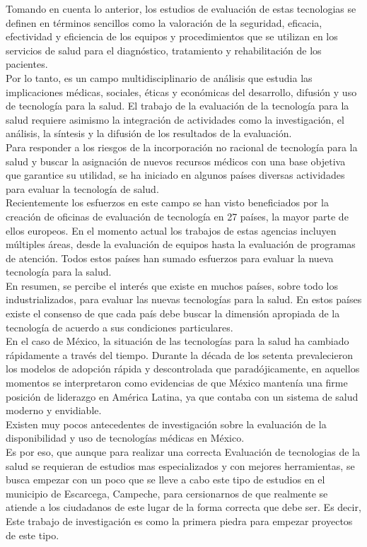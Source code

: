 \documentclass [a4paper, 12pt]{report}
\begin{document}
Tomando en cuenta lo anterior, los estudios de evaluación de estas tecnologias se definen en términos sencillos como la valoración de la seguridad, eficacia, efectividad y eficiencia de los equipos y procedimientos que se utilizan en los servicios de salud para el diagnóstico, tratamiento y rehabilitación de los pacientes.\\
Por lo tanto, es un campo multidisciplinario de análisis que estudia las implicaciones médicas, sociales, éticas y económicas
del desarrollo, difusión y uso de tecnología para la salud.
El trabajo de la evaluación de la tecnología para la salud requiere asimismo la integración de actividades como la investigación, el análisis, la síntesis y la difusión de los resultados de la evaluación.\\
Para responder a los riesgos de la incorporación no racional de tecnología para la salud y buscar la asignación de nuevos recursos médicos con una base objetiva que garantice su utilidad, se ha iniciado en algunos países diversas actividades para evaluar la tecnología de salud. \\
Recientemente los esfuerzos en este campo se han visto beneficiados por la creación de oficinas de evaluación de tecnología en 27 países, la mayor parte de ellos europeos. En el momento actual los trabajos de estas agencias incluyen múltiples áreas, desde la evaluación de equipos hasta la evaluación de programas de atención. Todos estos países han sumado esfuerzos para evaluar la nueva tecnología para la salud.\\
En resumen, se percibe el interés que existe en muchos países, sobre todo los industrializados, para evaluar las nuevas
tecnologías para la salud. En estos países existe el consenso de que cada país debe buscar la dimensión apropiada de la
tecnología de acuerdo a sus condiciones particulares.\\
En el caso de México, la situación de las tecnologías para la salud ha cambiado rápidamente a través del tiempo. Durante la
década de los setenta prevalecieron los modelos de adopción rápida y descontrolada que paradójicamente, en aquellos
momentos se interpretaron como evidencias de que México mantenía una firme posición de liderazgo en América Latina, ya que contaba con un sistema de salud moderno y envidiable.\\
Existen muy pocos antecedentes de investigación sobre la evaluación de la disponibilidad y uso de tecnologías médicas en México.\\
Es por eso, que aunque para realizar una correcta Evaluación de tecnologias de la salud se requieran de estudios mas especializados y con mejores herramientas, se busca empezar con un poco que se lleve a cabo este tipo de estudios en el municipio de Escarcega, Campeche, para cersionarnos de que realmente se atiende a los ciudadanos de este lugar de la forma correcta que debe ser. Es decir, Este trabajo de investigación es como la primera piedra para empezar proyectos de este tipo.
\end{document}
